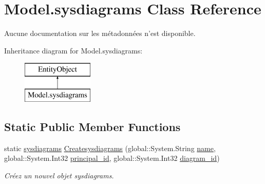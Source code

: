 \hypertarget{class_model_1_1sysdiagrams}{\section{Model.\-sysdiagrams Class Reference}
\label{class_model_1_1sysdiagrams}
}


Aucune documentation sur les métadonnées n'est disponible.  


Inheritance diagram for Model.\-sysdiagrams\-:\begin{figure}[H]
\begin{center}
\leavevmode
\includegraphics[height=2.000000cm]{class_model_1_1sysdiagrams}
\end{center}
\end{figure}
\subsection*{Static Public Member Functions}
\begin{DoxyCompactItemize}
\item 
static \hyperlink{class_model_1_1sysdiagrams}{sysdiagrams} \hyperlink{class_model_1_1sysdiagrams_a0bfba4d60b5d866002878c64d33a38ff}{Createsysdiagrams} (global\-::\-System.\-String \hyperlink{class_model_1_1sysdiagrams_a7b2a5e745f15a3fde21f58e57786c2a0}{name}, global\-::\-System.\-Int32 \hyperlink{class_model_1_1sysdiagrams_ae438ae2c8f6f3fa8f1a52aeabdba5efd}{principal\-\_\-id}, global\-::\-System.\-Int32 \hyperlink{class_model_1_1sysdiagrams_a9ce7be08043952209a0b1fce62fe0d86}{diagram\-\_\-id})
\begin{DoxyCompactList}\small\item\em Créez un nouvel objet sysdiagrams. \end{DoxyCompactList}\end{DoxyCompactItemize}
